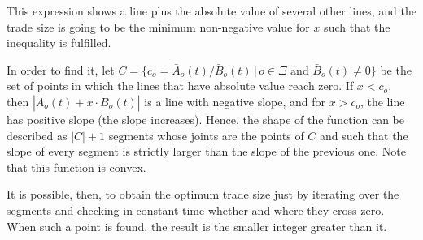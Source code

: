 \documentclass[10pt, a4paper, oneside]{article}
\newcommand{\offsets}{\ensuremath{\Xi}}
\begin{document}
\noindent This expression shows a line plus the absolute value of several other lines, and the trade size is going to be the minimum non-negative value for $x$ such that the inequality is fulfilled.

\noindent In order to find it, let $C=\{c_o=\bar{A}_o(t)/\bar{B}_o(t)\, | \, o\in\offsets \text{ and } \bar{B}_o(t)\neq0\}$ be the set of points in which the lines that have absolute value reach zero.
If $x < c_o$, then $|\bar{A}_o(t) + x\cdot\bar{B}_o(t)|$ is a line with negative slope, and for $x > c_o$, the line has positive slope (the slope increases). Hence, the shape of the function can be described as
$|C|+1$ segments whose joints are the points of $C$ and such that the slope of every segment is strictly larger than the slope of the previous one. Note that this function is convex.

\noindent It is possible, then, to obtain the optimum trade size just by iterating over the segments and checking in constant time whether and where they cross zero. When such a point is found, the result is the smaller
integer greater than it.

\fi






\end{document}
